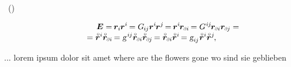\vspace{-0.2em}\noindent
{}  ~() 

\nopagebreak\vspace{-0.4em}\begin{multline*}
\shoveleft{ \hspace{3em} \UnitDyad
= \hspace{-0.2ex} \currentlocationvector_i \hspace{-0.1ex} \currentlocationvector^{i} \hspace{-0.2ex}
= G_{\hspace{-0.15ex}i\hspace{-0.1ex}j} \currentlocationvector^{i} \hspace{-0.2ex} \currentlocationvector^j \hspace{-0.25ex}
= \hspace{-0.2ex} \currentlocationvector^{i} \hspace{-0.2ex} \currentlocationvector_\differentialindex{i} \hspace{-0.2ex}
= G^{\hspace{.1ex}i\hspace{-0.1ex}j} \hspace{-0.2ex} \currentlocationvector_\differentialindex{i} \currentlocationvector_\differentialindex{\hspace{-0.1ex}j}
= \hfill }
\\[-0.3em]
= \initiallocationvector^i \initiallocationvector_\differentialindex{i} \hspace{-0.2ex}
= \textsl{g}^{\hspace{.2ex}i\hspace{-0.1ex}j} \initiallocationvector_\differentialindex{i} \initiallocationvector_\differentialindex{\hspace{-0.1ex}j} \hspace{-0.2ex}
= \initiallocationvector_\differentialindex{i} \initiallocationvector^i \hspace{-0.25ex}
= \textsl{g}_{i\hspace{-0.1ex}j} \hspace{.1ex} \initiallocationvector^i \initiallocationvector^j
\hspace{-0.2ex} ,
\end{multline*}

\vspace{-0.3em}\noindent
{} ... lorem ipsum dolor sit amet where are the flowers gone wo sind sie geblieben

